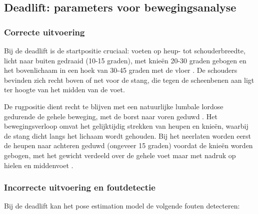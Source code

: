 \subsection{Deadlift: parameters voor bewegingsanalyse}

\subsubsection{Correcte uitvoering}
Bij de deadlift is de startpositie cruciaal: voeten op heup- tot schouderbreedte, licht naar buiten gedraaid (10-15 graden), met knieën 20-30 graden gebogen en het bovenlichaam in een hoek van 30-45 graden met de vloer \autocite{Bird2010}. 
De schouders bevinden zich recht boven of net voor de stang, die tegen de scheenbenen aan ligt ter hoogte van het midden van de voet.

De rugpositie dient recht te blijven met een natuurlijke lumbale lordose gedurende de gehele beweging, met de borst naar voren geduwd \autocite{Ronai2020}. 
Het bewegingsverloop omvat het gelijktijdig strekken van heupen en knieën, waarbij de stang dicht langs het lichaam wordt gehouden. 
Bij het neerlaten worden eerst de heupen naar achteren geduwd (ongeveer 15 graden) voordat de knieën worden gebogen, met het gewicht verdeeld over de gehele voet maar met nadruk op hielen en middenvoet \autocite{Ronai2020}.

\subsubsection{Incorrecte uitvoering en foutdetectie}
Bij de deadlift kan het pose estimation model de volgende fouten detecteren:

